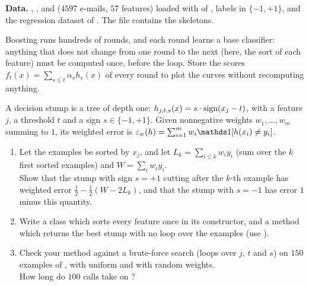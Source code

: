 \documentclass[a4paper,11pt]{article}
\begin{document}
\medskip
\noindent\textbf{Data.} , ,  and  ($4597$ e-mails, $57$
features) loaded with  of , labels in $\{-1,+1\}$, and the 
regression dataset of . The file  contains the skeletons.

\begin{tip}
Boosting runs hundreds of rounds, and each round learns a base classifier: anything that does not change from one
round to the next (here, the sort of each feature) must be computed once, before the loop. Store the scores
$f_t(x)=\sum_{s\leq t}\alpha_sh_s(x)$ of every round to plot the curves without recomputing anything.
\end{tip}

\label{p3:stumps}

A decision stump is a tree of depth one: $h_{j,t,s}(x)=s\cdot\operatorname{sign}(x_j-t)$, with a feature $j$, a threshold $t$ and a
sign $s\in\{-1,+1\}$. Given nonnegative weights $w_1,\dots,w_m$ summing to $1$, its weighted error is
$\varepsilon_w(h)=\sum_{i=1}^mw_i\ind{h(x_i)\neq y_i}$.

\begin{enumerate}
\item Let the examples be sorted by $x_j$, and let $L_k=\sum_{i\leq k}w_iy_i$ (sum over the $k$ first sorted examples)
      and $W=\sum_iw_iy_i$.\\
      Show that the stump with sign $s=+1$ cutting after the $k$-th example has weighted error
      $\frac12-\frac12(W-2L_k)$, and that the stump with $s=-1$ has error $1$ minus this quantity.
\item Write a class  which sorts every feature once in its constructor, and a method
       which returns the best stump with no loop over the examples (use ).
\item Check your method against a brute-force search (loops over $j$, $t$ and $s$) on $150$ examples of , with
      uniform and with random weights.\\
      How long do $100$ calls take on ?
\end{enumerate}

\label{p3:ada}
\end{document}
